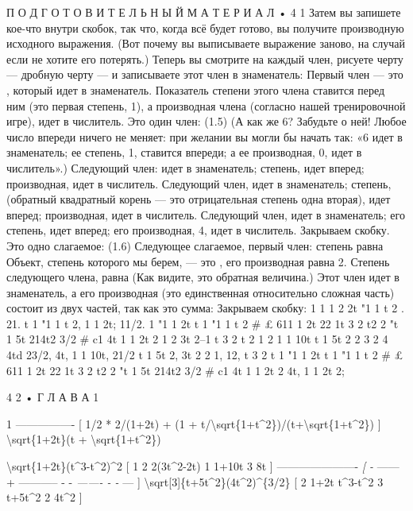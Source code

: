 \documentclass[10pt,oneside]{article}
\begin{document}
П О Д Г О Т О В И Т Е Л Ь Н Ы Й  М А Т Е Р И А Л • 4 1 Затем вы запишете кое-что внутри скобок, так что, когда всё будет готово, вы получите производную исходного выражения. (Вот почему вы выписываете выражение заново, на случай если не хотите его потерять.) Теперь вы смотрите на каждый член, рисуете черту --- дробную черту --- и записываете этот член в знаменатель: Первый член --- это , который идет в знаменатель. Показатель степени этого члена ставится перед ним (это первая степень, 1), а производная члена (согласно нашей тренировочной игре), идет в числитель. Это один член: (1.5) (А как же 6? Забудьте о ней! Любое число впереди ничего не меняет: при желании вы могли бы начать так: «6 идет в знаменатель; ее степень, 1, ставится впереди; а ее производная, 0, идет в числитель».) Следующий член: идет в знаменатель; степень, идет вперед; производная, идет в числитель. Следующий член, идет в знаменатель; степень, (обратный квадратный корень --- это отрицательная степень одна вторая), идет вперед; производная, идет в числитель. Следующий член, идет в знаменатель; его степень, идет вперед; его производная, 4, идет в числитель. Закрываем скобку. Это одно слагаемое: (1.6) Следующее слагаемое, первый член: степень равна Объект, степень которого мы берем, --- это , его производная равна 2. Степень следующего члена, равна (Как видите, это обратная величина.) Этот член идет в знаменатель, а его производная (это единственная относительно сложная часть) состоит из двух частей, так как это сумма: Закрываем скобку: 1 1 1 2 2t "1 1 t 2 . 21. t 1 "1 1 t 2, 1 1 2t; 11/2. 1 "1 1 2t t 1 "1 1 t 2 \# £ 611 1 2t 22 1t 3 2 t2 2 "t 1 5t 214t2 3/2 \# c1 4t 1 1 2t 2 1 2 3t 2–1 t 3 2 t 2 1 2 1 1 10t t 1 5t 2 2 3 2 4 4td 23/2, 4t, 1 1 10t, 21/2 t 1 5t 2, 3t 2 2 1, 12, t 3 2 t 1 "1 1 2t t 1 "1 1 t 2 \# £ 611 1 2t 22 1t 3 2 t2 2 "t 1 5t 214t2 3/2 \# c1 4t 1 1 2t 2 4t, 1 1 2t 2;\par

4 2 • Г Л А В А  1\par

1 ---------------- [ 1/2 * 2/(1+2t) + (1 + t/\textbackslash{}sqrt\{1+t\textasciicircum{}2\})/(t+\textbackslash{}sqrt\{1+t\textasciicircum{}2\}) ] \textbackslash{}sqrt\{1+2t\}(t + \textbackslash{}sqrt\{1+t\textasciicircum{}2\})\par

\textbackslash{}sqrt\{1+2t\}(t\textasciicircum{}3-t\textasciicircum{}2)\textasciicircum{}2   [ 1   2      2(3t\textasciicircum{}2-2t)   1   1+10t     3   8t  ] ---------------------- \emph{ [ - } ------ + ----------- - - \emph{ ------- - - } --- ] \textbackslash{}sqrt[3]\{t+5t\textasciicircum{}2\}(4t\textasciicircum{}2)\textasciicircum{}\{3/2\}   [ 2   1+2t     t\textasciicircum{}3-t\textasciicircum{}2     3   t+5t\textasciicircum{}2    2   4t\textasciicircum{}2 ]\par
\end{document}
